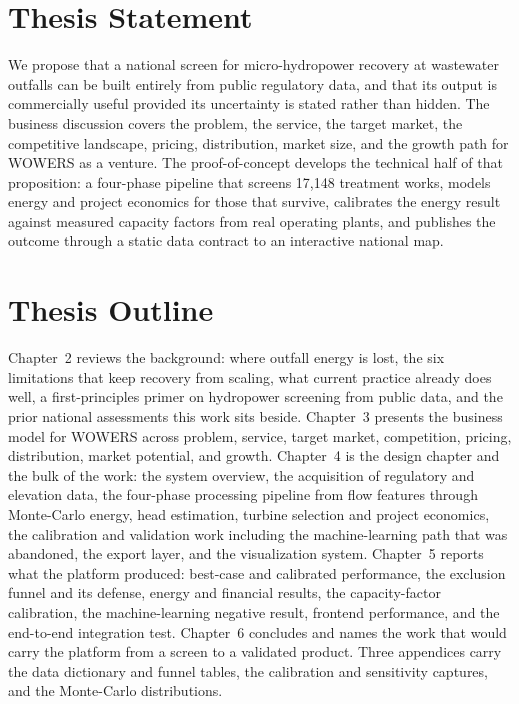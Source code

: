 \documentclass[12pt,letterpaper]{report}
\begin{document}
\section{Thesis Statement}

We propose that a national screen for micro-hydropower recovery at wastewater
outfalls can be built entirely from public regulatory data, and that its output is
commercially useful provided its uncertainty is stated rather than hidden. The
business discussion covers the problem, the service, the target market, the
competitive landscape, pricing, distribution, market size, and the growth path for
WOWERS as a venture. The proof-of-concept develops the technical half of that
proposition: a four-phase pipeline that screens 17{,}148 treatment works, models
energy and project economics for those that survive, calibrates the energy result
against measured capacity factors from real operating plants, and publishes the
outcome through a static data contract to an interactive national map.

\section{Thesis Outline}

Chapter~2 reviews the background: where outfall energy is lost, the six
limitations that keep recovery from scaling, what current practice already does
well, a first-principles primer on hydropower screening from public data, and the
prior national assessments this work sits beside. Chapter~3 presents the business
model for WOWERS across problem, service, target market, competition, pricing,
distribution, market potential, and growth. Chapter~4 is the design chapter and
the bulk of the work: the system overview, the acquisition of regulatory and
elevation data, the four-phase processing pipeline from flow features through
Monte-Carlo energy, head estimation, turbine selection and project economics, the
calibration and validation work including the machine-learning path that was
abandoned, the export layer, and the visualization system. Chapter~5 reports what
the platform produced: best-case and calibrated performance, the exclusion
funnel and its defense, energy and financial results, the capacity-factor
calibration, the machine-learning negative result, frontend performance, and the
end-to-end integration test. Chapter~6 concludes and names the work that would
carry the platform from a screen to a validated product. Three appendices carry
the data dictionary and funnel tables, the calibration and sensitivity captures,
and the Monte-Carlo distributions.
\end{document}
